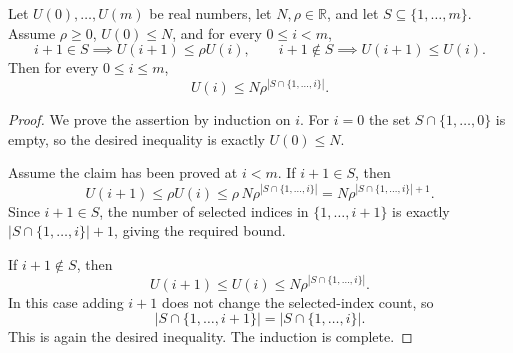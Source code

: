 \begin{helper}
Let \(U(0),\ldots,U(m)\) be real numbers, let \(N,\rho\in\mathbb R\), and
let \(S\subseteq\{1,\ldots,m\}\).  Assume \(\rho\ge0\), \(U(0)\le N\), and
for every \(0\le i<m\),
\[
  i+1\in S \implies U(i+1)\le \rho U(i),
  \qquad
  i+1\notin S \implies U(i+1)\le U(i).
\]
Then for every \(0\le i\le m\),
\[
  U(i)\le N\rho^{|S\cap\{1,\ldots,i\}|}.
\]
\end{helper}
\begin{proof}
We prove the assertion by induction on \(i\).  For \(i=0\) the set
\(S\cap\{1,\ldots,0\}\) is empty, so the desired inequality is exactly
\(U(0)\le N\).

Assume the claim has been proved at \(i<m\).  If \(i+1\in S\), then
\[
  U(i+1)\le \rho U(i)
  \le \rho\,N\rho^{|S\cap\{1,\ldots,i\}|}
  = N\rho^{|S\cap\{1,\ldots,i\}|+1}.
\]
Since \(i+1\in S\), the number of selected indices in
\(\{1,\ldots,i+1\}\) is exactly
\(|S\cap\{1,\ldots,i\}|+1\), giving the required bound.

If \(i+1\notin S\), then
\[
  U(i+1)\le U(i)\le N\rho^{|S\cap\{1,\ldots,i\}|}.
\]
In this case adding \(i+1\) does not change the selected-index count, so
\[
  |S\cap\{1,\ldots,i+1\}|=|S\cap\{1,\ldots,i\}|.
\]
This is again the desired inequality.  The induction is complete.
\end{proof}
